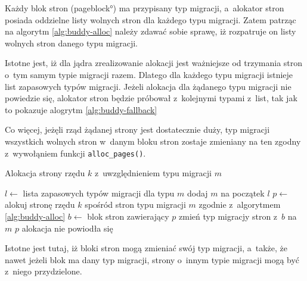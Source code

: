Każdy blok stron (\ang{pageblock}) ma przypisany typ migracji,
a~alokator stron posiada oddzielne listy wolnych stron dla każdego
typu migracji.  Zatem patrząc na algorytm \ref{alg:buddy-alloc} należy
zdawać sobie sprawę, iż rozpatruje on listy wolnych stron danego typu
migracji.

Istotne jest, iż dla jądra zrealizowanie alokacji jest ważniejsze od
trzymania stron o~tym samym typie migracji razem.  Dlatego dla każdego
typu migracji istnieje list zapasowych typów migracji.  Jeżeli
alokacja dla żądanego typu migracji nie powiedzie się, alokator stron
będzie próbował z~kolejnymi typami z~list, tak jak to pokazuje
alogrytm \ref{alg:buddy-fallback}

Co więcej, jeżęli rząd żądanej strony jest dostatecznie duży, typ
migracji wszystkich wolnych stron w~danym bloku stron zostaje
zmieniany na ten zgodny z~wywołąniem funkcji
\lstinline|alloc_pages()|.

\begin{algorithm}
\caption{Alokacja strony rzędu $k$ z~uwzględnieniem typu migracji $m$}
\label{alg:buddy-fallback}
\begin{algorithmic}[1]
\STATE $l \gets$ lista zapasowych typów migracji dla typu $m$
\STATE dodaj $m$ na początek $l$
    \STATE $p \gets$ alokuj stronę rzędu $k$ spośród stron typu
    migracji $m$ zgodnie z~algorytmem \ref{alg:buddy-alloc}
            \STATE $b \gets$ blok stron zawierający $p$
            \STATE zmień typ migracjy stron z~$b$ na $m$
        \ENDIF
        \RETURN $p$
    \ENDIF
\ENDFOR
\RETURN alokacja nie powiodła się
\end{algorithmic}
\end{algorithm}

Istotne jest tutaj, iż bloki stron mogą zmieniać swój typ migracji,
a~także, że nawet jeżeli blok ma dany typ migracji, strony o~innym
typie migracji mogą być z~niego przydzielone.
